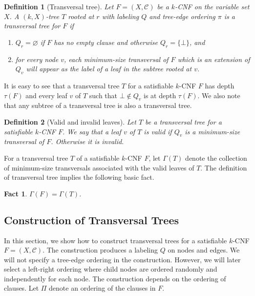 \documentclass[10pt,a4paper]{article}
\let\emptyset\varnothing
\newtheorem{fact}{Fact}
\newtheorem{definition}{Definition}
\newcommand{\cC}{\mathcal{C}}
\newcommand{\trn}{\tau}
\newcommand{\trans}{\Gamma}
\begin{document}
\begin{definition}[Transversal tree]
Let $F=(X,\cC)$ be a $k$-CNF on the variable set $X$.
A $(k,X)$-tree $T$ rooted at $r$ with labeling $Q$ and tree-edge ordering $\pi$
is a \emph{transversal} tree for $F$ if
\begin{enumerate}
\item $Q_r = \emptyset$ if $F$ has no empty clause 
and otherwise $Q_r = \{\bot\}$, and 
\item for every node $v$, each 
minimum-size transversal of $F$ which is an 
extension of $Q_v$ will appear as 
the label of a leaf in the subtree rooted at $v$.
\end{enumerate}
\end{definition}

It is easy to see that  a transversal tree $T$ for a satisfiable
$k$-CNF $F$ has depth $\trn(F)$ and 
every leaf $v$ of $T$ such that $\bot \notin Q_v$ is at depth $\trn(F)$.
We also note that any subtree of a transversal tree is also a transversal tree.

\begin{definition}[Valid and invalid leaves]
Let $T$ be a transversal tree for a satisfiable $k$-CNF $F$.
We say that a  leaf $v$ of $T$
is \emph{valid} if $Q_v$ is a minimum-size transversal of $F$.
Otherwise it is \emph{invalid}.
\end{definition}

For a transversal tree $T$ of a satisfiable $k$-CNF $F$, 
let $\trans(T)$ denote the 
collection  of minimum-size transversals associated 
with the valid leaves of $T$. The definition of transversal tree implies the following basic fact.

\begin{fact}
$\trans(F) = \trans(T)$.
\end{fact}


\subsection{Construction of Transversal Trees}

In this section, we show how to construct transversal trees for 
a satisfiable $k$-CNF 
$F=(X,\cC)$. 
The construction produces a labeling $Q$ on nodes and edges.
We will not specify a tree-edge ordering in the construction.
However, we will later select
a  left-right ordering where child nodes 
are ordered randomly and independently for each node.
The construction depends on the ordering of clauses.
Let $\Pi$ denote an ordering of the clauses in $F$.
\end{document}
